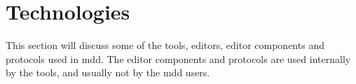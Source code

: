 \section{Technologies}\label{sec:technologies}

This section will discuss some of the tools, editors, editor components and protocols used in \acrlong{mdd}.
The editor components and protocols are used internally by the tools, and usually not by the \acrshort{mdd} users.








